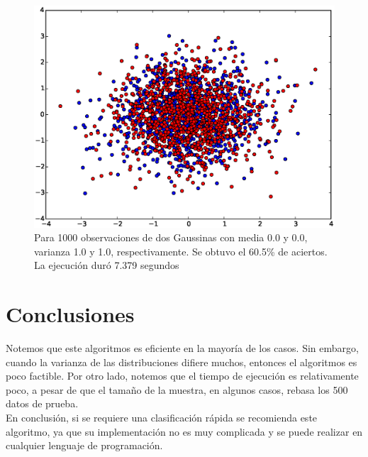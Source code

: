 \documentclass[11pt,letterpaper,reqno]{article}
\begin{document}
\begin{figure}[h]
	\centering
	\includegraphics[scale=.5]{img9}
	\caption{Para 1000 observaciones de dos Gaussinas con media 0.0 y 0.0, varianza 1.0 y 1.0, respectivamente. Se obtuvo el 60.5\% de aciertos. La ejecución duró 7.379 segundos}
\end{figure}
\clearpage
\section{Conclusiones}
Notemos que este algoritmos es eficiente en la mayoría de los casos. Sin embargo, cuando la varianza de las distribuciones difiere muchos, entonces el algoritmos es poco factible. Por otro lado, notemos que el tiempo de ejecución es relativamente poco, a pesar de que el tamaño de la muestra, en algunos casos, rebasa los 500 datos de prueba.\\

En conclusión, si se requiere una clasificación rápida se recomienda este algoritmo, ya que su implementación no es muy complicada y se puede realizar en cualquier lenguaje de programación.
\end{document}
